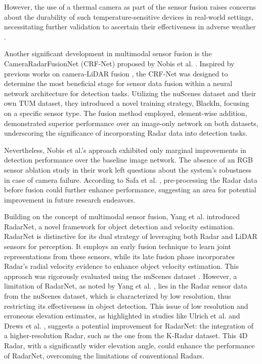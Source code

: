 \documentclass[report.tex]{subfiles}
\begin{document}
    However, the use of a thermal camera as part of the sensor fusion raises concerns about the durability of such temperature-sensitive devices in real-world settings, necessitating further validation to ascertain their effectiveness in adverse weather \cite{zang2019impact}.

    Another significant development in multimodal sensor fusion is the CameraRadarFusionNet (CRF-Net) proposed by Nobis et al. \cite{nobis2019deep}. Inspired by previous works on camera-LiDAR fusion \cite{yu2019multi, caltagirone2019LiDAR}, the CRF-Net was designed to determine the most beneficial stage for sensor data fusion within a neural network architecture for detection tasks. Utilizing the nuScenes \cite{caesar2020nuscenes} dataset and their own TUM dataset, they introduced a novel training strategy, BlackIn, focusing on a specific sensor type. The fusion method employed, element-wise addition, demonstrated superior performance over an image-only network on both datasets, underscoring the significance of incorporating Radar data into detection tasks.

    Nevertheless, Nobis et al.'s approach \cite{nobis2019deep} exhibited only marginal improvements in detection performance over the baseline image network. The absence of an RGB sensor ablation study in their work left questions about the system's robustness in case of camera failure. According to Safa et al. \cite{safa2021fail}, pre-processing the Radar data before fusion could further enhance performance, suggesting an area for potential improvement in future research endeavors.

    Building on the concept of multimodal sensor fusion, Yang et al. \cite{yang2020Radarnet} introduced RadarNet, a novel framework for object detection and velocity estimation. RadarNet is distinctive for its dual strategy of leveraging both Radar and LiDAR sensors for perception. It employs an early fusion technique to learn joint representations from these sensors, while its late fusion phase incorporates Radar's radial velocity evidence to enhance object velocity estimation. This approach was rigorously evaluated using the nuScenes dataset \cite{caesar2020nuscenes}. However, a limitation of RadarNet, as noted by Yang et al. \cite{yang2020Radarnet}, lies in the Radar sensor data from the nuScenes dataset, which is characterized by low resolution, thus restricting its effectiveness in object detection. This issue of low resolution and erroneous elevation estimates, as highlighted in studies like Ulrich et al. \cite{ulrich2021deepreflecs} and Drews et al. \cite{drews2022deepfusion}, suggests a potential improvement for RadarNet: the integration of a higher-resolution Radar, such as the one from the K-Radar dataset. This 4D Radar, with a significantly wider elevation angle, could enhance the performance of RadarNet, overcoming the limitations of conventional Radars.
\end{document}
